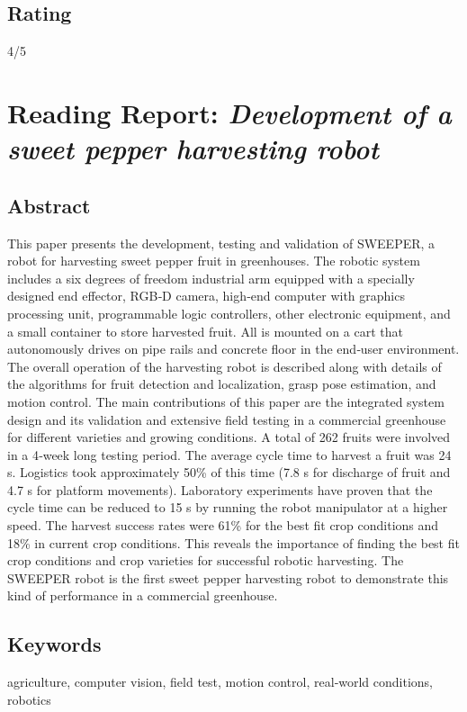 \subsection*{Rating}
4/5




\section{Reading Report: \emph{Development of a sweet pepper harvesting robot}}
\cite{Arad2020}

\subsection*{Abstract}
This paper presents the development, testing and validation of SWEEPER, a robot for
harvesting sweet pepper fruit in greenhouses. The robotic system includes a six
degrees of freedom industrial arm equipped with a specially designed end effector,
RGB‐D camera, high‐end computer with graphics processing unit, programmable logic
controllers, other electronic equipment, and a small container to store harvested
fruit. All is mounted on a cart that autonomously drives on pipe rails and concrete
floor in the end‐user environment. The overall operation of the harvesting robot is
described along with details of the algorithms for fruit detection and localization,
grasp pose estimation, and motion control. The main contributions of this paper are
the integrated system design and its validation and extensive field testing in a
commercial greenhouse for different varieties and growing conditions. A total of 262
fruits were involved in a 4‐week long testing period. The average cycle time to
harvest a fruit was 24 s. Logistics took approximately 50\% of this time (7.8 s for
discharge of fruit and 4.7 s for platform movements). Laboratory experiments have
proven that the cycle time can be reduced to 15 s by running the robot manipulator at
a higher speed. The harvest success rates were 61\% for the best fit crop conditions
and 18\% in current crop conditions. This reveals the importance of finding the best fit
crop conditions and crop varieties for successful robotic harvesting. The SWEEPER
robot is the first sweet pepper harvesting robot to demonstrate this kind of
performance in a commercial greenhouse.


\subsection*{Keywords}
agriculture, computer vision, field test, motion control, real‐world conditions, robotics


